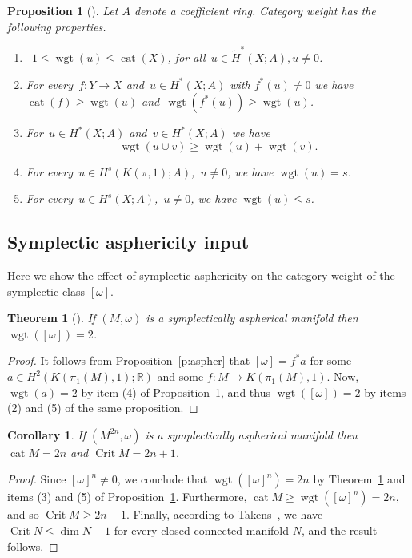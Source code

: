 \documentclass[12pt]{amsart}
\newcommand{\B}[1]{{\mathbb #1}}
\newcommand\R{\B R}
\newtheorem{thm}[subsection]{Theorem}
\newtheorem{cory}[subsection]{Corollary}
\newtheorem{prop}[subsection]{Proposition}
\numberwithin{equation}{section}
\theoremstyle{definition}
\theoremstyle{remark}
\newcommand\theoref{Theorem~\ref}
\newcommand\propref{Proposition~\ref}
\numberwithin{figure}{section}
\numberwithin{table}{section}
\newcommand\cat{\operatorname{cat}}
\newcommand\wgt{\operatorname{wgt}}
\newcommand\Crit{\operatorname{Crit}}
\begin{document}
\begin{prop}[\cite{R1,St,CLOT}] 
\label{p:wgtprops} 
Let $A$ denote a coefficient ring. Category weight has the following properties. 
\begin{enumerate} 
\item~$1\le \wgt(u) \leq \cat(X)$, for all~$u \in \widetilde 
H^*(X;A), u\ne 0$. 
\vskip3pt 
\item For every~$f\colon Y \to X$ and~$u\in H^*(X;A)$ with 
$f^*(u)\not = 0$ we have 
$\cat(f) \geq \wgt(u)$ and~$\wgt(f^*(u)) \geq \wgt(u)$. 
\vskip3pt 
\item For~$u\in H^*(X;A)$ and~$v\in H^*(X;A)$ we have 
\[ 
\wgt(u\cup v) \geq \wgt(u) + \wgt(v). 
\]  \vskip3pt 
\item For every~$u \in H^s(K(\pi,1);A)$,~$u\ne 0$, we have 
$\wgt(u)=s$.  \vskip3pt 
\item For every~$u \in H^s(X;A)$,~$u\ne 0$, we have 
$\wgt(u)\le s$.  \vskip3pt 
\end{enumerate} 
\end{prop} 
 
\subsection{Symplectic asphericity input} 
Here we show the effect of symplectic asphericity on the category  
weight of the symplectic class $[\omega]$. 
 
\begin{thm}[\cite{RO}] 
\label{t:omega} 
If $(M,\omega)$ is a symplectically aspherical manifold then $\wgt([\omega])=2$. 
\end{thm} 
 
\begin{proof} 
It follows from \propref{p:aspher} that $[\omega]=f^*a$ for some $a\in  
H^2(K(\pi_1(M),1);\R)$  
and some $f: M \to K(\pi_1(M),1)$. Now, $\wgt(a)=2$ by item (4) of  
\propref{p:wgtprops}, and thus  
$\wgt([\omega])=2$ by items (2) and (5) of the same proposition.  
\end{proof} 
 
\begin{cory}\label{c:lscat} 
If $(M^{2n},\omega)$ is a symplectically aspherical manifold then $\cat M=2n$ 
and  
$\Crit M =2n+1$.  
\end{cory} 
 
\begin{proof}  Since $[\omega]^n\ne 0$, we conclude that  
$\wgt([\omega]^n)=2n$ by \theoref{t:omega} and items (3) and (5) of  
\propref{p:wgtprops}. Furthermore, $\cat M \ge \wgt([\omega]^n)=2n$, and so  
$\Crit M \ge 2n+1$.  Finally, according to Takens~\cite{T}, we have $\Crit N \le 
\dim N+1$ for every closed  
connected manifold $N$, and the result follows. 
\end{proof} 
 
\end{document}
